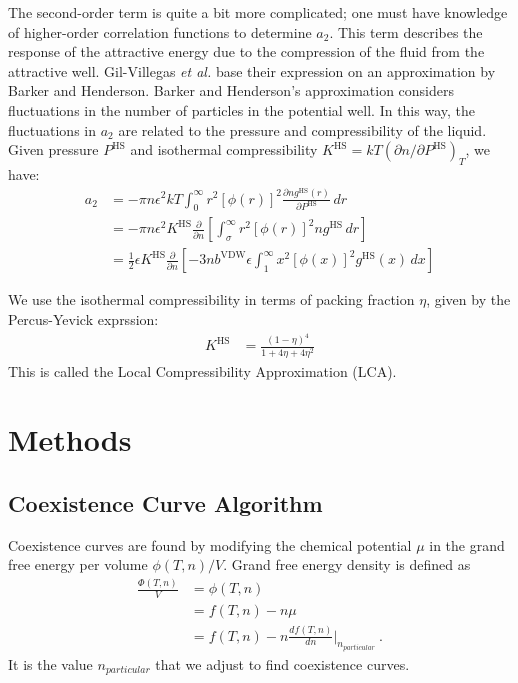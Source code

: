 \documentclass[letterpaper,twocolumn,amsmath,amssymb,prb]{revtex4-1}
\newcommand{\npart}{\ensuremath{n_{particular}}}
\newcommand{\1}{\ensuremath{\textbf{r}_1}}
\newcommand{\2}{\ensuremath{\textbf{r}_2}}
\newcommand{\3}{\ensuremath{\textbf{r}_3}}
\newcommand{\4}{\ensuremath{\textbf{r}_4}}
\begin{document}
The second-order term is quite a bit more complicated; one must have
knowledge of higher-order correlation functions to determine
$a_2$. This term describes the response of the attractive energy due
to the compression of the fluid from the attractive well. Gil-Villegas
\emph{et al.} base their expression on an approximation by Barker and
Henderson.\cite{Barker67} Barker and Henderson's approximation
considers fluctuations in the number of particles in the potential
well. In this way, the fluctuations in $a_2$ are related to the
pressure and compressibility of the liquid. Given pressure
$P^\text{HS}$ and isothermal compressibility $K^\text{HS} =
kT\left(\partial n /\partial P^\text{HS}\right)_T$, we have:
\begin{align}
  a_2 &= -\pi n \epsilon^2kT\int_0^\infty r^2\left[\phi(r)\right]^2\frac{\partial n  g^\text{HS}(r)}{\partial P^\text{HS}}\,dr \\
  &= -\pi n \epsilon^2K^\text{HS}\frac{\partial}{\partial n }\left[\int_\sigma^\infty r^2\left[\phi(r)\right]^2 n  g^\text{HS}\,dr\right] \\
  &= \frac{1}{2}\epsilon K^\text{HS}\frac{\partial}{\partial n }\left[-3 n  b^\text{VDW}\epsilon\int_1^\infty x^2\left[\phi(x)\right]^2 g^\text{HS}(x)\,dx \right]
\end{align}

We use the isothermal compressibility in terms of packing fraction
$\eta$, given by the Percus-Yevick exprssion:\cite{Barker76}
\begin{align}
  K^\text{HS} &= \frac{\left(1 - \eta\right)^4}{1 + 4\eta + 4\eta^2}
\end{align}
This is called the Local Compressibility Approximation (LCA).
\section{Methods}\label{sec:methods}

\subsection{Coexistence Curve Algorithm}\label{subsec:coexis}
Coexistence curves are found by modifying the chemical potential $\mu$
in the grand free energy per volume $\phi(T,n)/V$. Grand free energy
density is defined as
\begin{align}
  \frac{\Phi(T,n)}{V} &= \phi(T,n) \nonumber \\
                 &= f(T,n) - n\mu \nonumber \\
                 &= f(T,n) - n\frac{df(T,n)}{dn}\bigg|_{\npart}\ .
\end{align}
It is the value $\npart$ that we adjust to find coexistence curves.
\end{document}
